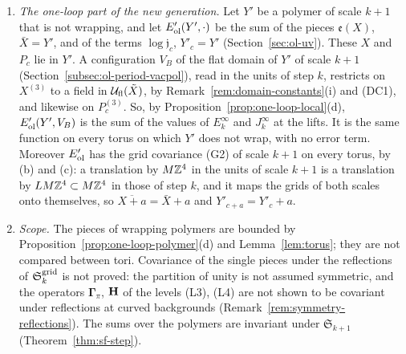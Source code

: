 \begin{remark}\label{rem:one-loop-local-use}
\begin{enumerate}[label=(\alph*)]
\item \emph{The one-loop part of the new generation.} Let $Y'$ be a polymer of scale $k+1$ that is not wrapping, and let $E'_{\rm ol}(Y',\cdot)$ be the sum of the pieces $\mathfrak e(X)$, $\bar X=Y'$, and of the terms $\log\mathfrak j_c$, $Y'_c=Y'$ (Section~\ref{sec:ol-uv}). These $X$ and $P_c$ lie in $Y'$. A configuration $V_B$ of the flat domain of $Y'$ of scale $k+1$ (Section~\ref{subsec:ol-period-vacpol}), read in the units of step $k$, restricts on $X^{(3)}$ to a field in $\mathcal U_{\rm fl}(\tilde X)$, by Remark~\ref{rem:domain-constants}(i) and (DC1), and likewise on $P_c^{(3)}$. So, by Proposition~\ref{prop:one-loop-local}(d), $E'_{\rm ol}(Y',V_B)$ is the sum of the values of $E^\infty_k$ and $J^\infty_k$ at the lifts. It is the same function on every torus on which $Y'$ does not wrap, with no error term. Moreover $E'_{\rm ol}$ has the grid covariance (G2) of scale $k+1$ on every torus, by (b) and (c): a translation by $M\mathbb Z^4$ in the units of scale $k+1$ is a translation by $LM\mathbb Z^4\subset M\mathbb Z^4$ in those of step $k$, and it maps the grids of both scales onto themselves, so $\overline{X+a}=\bar X+a$ and $Y'_{c+a}=Y'_c+a$.
\item \emph{Scope.} The pieces of wrapping polymers are bounded by Proposition~\ref{prop:one-loop-polymer}(d) and Lemma~\ref{lem:torus}; they are not compared between tori. Covariance of the single pieces under the reflections of $\mathfrak S^{\rm grid}_k$ is not proved: the partition of unity is not assumed symmetric, and the operators $\boldsymbol\Gamma_\pi$, $\mathbf H$ of the levels (L3), (L4) are not shown to be covariant under reflections at curved backgrounds (Remark~\ref{rem:symmetry-reflections}). The sums over the polymers are invariant under $\mathfrak S_{k+1}$ (Theorem~\ref{thm:sf-step}).
\end{enumerate}
\end{remark}
